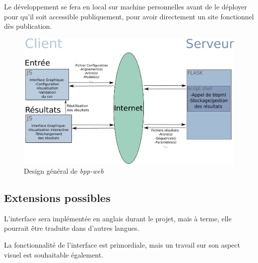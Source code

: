 Le développement se fera en local sur machine personnelles
avant de le déployer pour qu'il soit accessible publiquement,
pour avoir directement un site fonctionnel dès publication.

\begin{figure}
	\caption{Design général de \textit{bpp-web}}
	\includegraphics[scale=0.5]{fig/SchemaConcept.pdf}
	\centering
\end{figure}


\subsection{Extensions possibles}

L'interface sera implémentée en anglais durant le projet,
mais à terme, elle pourrait être traduite dans d'autres langues.

La fonctionnalité de l'interface est primordiale,
mais un travail sur son aspect visuel est souhaitable également.
